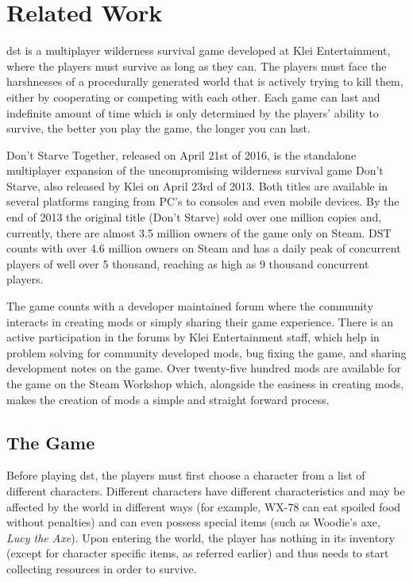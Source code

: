 \section{Related Work}
\gls{dst} is a multiplayer wilderness survival game developed at Klei Entertainment, where the players must survive as long as they can.
The players must face the harshnesses of a procedurally generated world that is actively trying to kill them, either by cooperating or competing with each other.
Each game can last and indefinite amount of time which is only determined by the players' ability to survive, the better you play the game, the longer you can last.

Don't Starve Together, released on April 21st of 2016, is the standalone multiplayer expansion of the uncompromising wilderness survival game Don't Starve, also released by Klei on April 23rd of 2013.
Both titles are available in several platforms ranging from PC's to consoles and even mobile devices.
By the end of 2013 the original title (Don't Starve) sold over one million copies and, currently, there are almost 3.5 million owners of the game only on Steam.
DST counts with over 4.6 million owners on Steam and has a daily peak of concurrent players of well over 5 thousand, reaching as high as 9 thousand concurrent players.

The game counts with a developer maintained forum where the community interacts in creating mods or simply sharing their game experience.
There is an active participation in the forums by Klei Entertainment staff, which help in problem solving for community developed mods, bug fixing the game, and sharing development notes on the game.
Over twenty-five hundred mods are available for the game on the Steam Workshop which, alongside the easiness in creating mods, makes the creation of mods a simple and straight forward process.

\subsection{The Game}
Before playing \gls{dst}, the players must first choose a character from a list of different characters.
Different characters have different characteristics and may be affected by the world in different ways (for example, WX-78 can eat spoiled food without penalties) and can even possess special items (such as Woodie's axe, \textit{Lucy the Axe}).
Upon entering the world, the player has nothing in its inventory (except for character specific items, as referred earlier) and thus needs to start collecting resources in order to survive.


